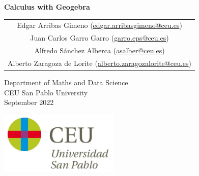 \begin{titlepage}
\thispagestyle{empty}
\vspace*{7cm}
\par

\begin{center}
\normalfont\fontsize{30}{30}\selectfont
{\bfseries \color{blueceu}Calculus with Geogebra}
\end{center}
\vspace{1cm}

\begin{center}
\Large
\begin{tabular}{c}
Edgar Arribas Gimeno (\url{edgar.arribasgimeno@ceu.es})\\
Juan Carlos Garro Garro (\url{garro.eps@ceu.es})\\
Alfredo Sánchez Alberca (\url{asalber@ceu.es})\\
Alberto Zaragoza de Lorite (\url{alberto.zaragozalorite@ceu.es})
\end{tabular}

\medskip 
Department of Maths and Data Science\\ CEU San Pablo University\\[1cm]
\medskip 
September 2022

\vspace{1cm}
\includegraphics[height=3cm]{img/logo_uspceu}
\end{center}
\vfill
\end{titlepage}